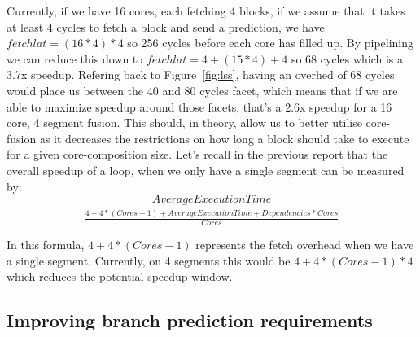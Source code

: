 Currently, if we have 16 cores, each fetching 4 blocks, if we assume that it takes at least 4 cycles to fetch a block and send a prediction, we have
$fetchlat=(16 * 4)*4$  so 256 cycles before each core has filled up.
By pipelining we can reduce this down to $fetchlat=4+(15*4)+4$  so 68 cycles which is a 3.7x speedup.
Refering back to Figure~\ref{fig:lss}, having an overhed of 68 cycles would place us between the 40 and 80 cycles facet, which means that if we are able to maximize speedup around those facets, that's a 2.6x speedup for a 16 core, 4 segment fusion.
This should, in theory, allow us to better utilise core-fusion as it decreases the restrictions on how long a block should take to execute for a given core-composition size.
Let's recall in the previous report that the overall speedup of a loop, when we only have a single segment can be measured by:
\begin{equation}\label{eq:avspeed}
\frac{Average Execution Time}{\frac{4+4*(Cores -1)+ Average Execution Time + Dependencies  * Cores}{ Cores}}
\end{equation}

In this formula, $4+4*(Cores-1)$ represents the fetch overhead when we have a single segment.
Currently, on 4 segments this would be $4+4*(Cores-1)*4$ which reduces the potential speedup window.

\subsection{Improving branch prediction requirements}

